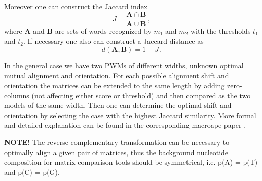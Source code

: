 Moreover one can construct the Jaccard index 
\begin{equation}J = \frac{\mathbf{A}\cap \mathbf{B}}{\mathbf{A}\cup \mathbf{B}}\,, \end{equation}
where $\mathbf{A}$ and $\mathbf{B}$ are 
sets of words recognized by $m_1$ and $m_2$ with the thresholds $t_1$ and $t_2$. If necessary one also can 
construct a Jaccard distance as 
\begin{equation}d(\mathbf{A},\mathbf{B}) = 1 - J\,.\end{equation}

In the general case we have two PWMs of different widths, unknown optimal mutual 
alignment and orientation. For each possible alignment shift and orientation the matrices can be 
extended to the same length by adding zero-columns (not affecting either score or threshold) 
and then compared as the two models of the same width. Then one can determine the optimal 
shift and orientation by selecting the case with the highest Jaccard similarity. More formal and 
detailed explanation can be found in the corresponding macroape paper \cite{MACROAPE}.

\textbf{NOTE!} The reverse complementary transformation can be necessary to optimally align a given pair of matrices,
thus the background nucleotide composition for matrix comparison tools should be symmetrical, i.e. p(A) = p(T) and p(C) = p(G).
